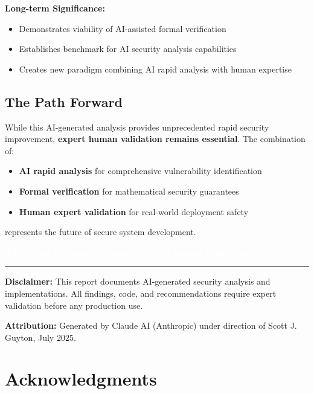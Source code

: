 \documentclass[11pt,a4paper]{article}
\begin{document}
\textbf{Long-term Significance:}
\begin{itemize}
    \item Demonstrates viability of AI-assisted formal verification
    \item Establishes benchmark for AI security analysis capabilities
    \item Creates new paradigm combining AI rapid analysis with human expertise
\end{itemize}

\subsection{The Path Forward}

While this AI-generated analysis provides unprecedented rapid security improvement, \textbf{expert human validation remains essential}. The combination of:

\begin{itemize}
    \item \textbf{AI rapid analysis} for comprehensive vulnerability identification
    \item \textbf{Formal verification} for mathematical security guarantees
    \item \textbf{Human expert validation} for real-world deployment safety
\end{itemize}

represents the future of secure system development.

\begin{center}
\colorbox{successgreen}{\textcolor{white}{\textbf{The future of secure systems lies in AI-human collaboration}}}
\end{center}

\vspace{2cm}

\hrule

\vspace{0.5cm}

\textbf{Disclaimer:} This report documents AI-generated security analysis and implementations. All findings, code, and recommendations require expert validation before any production use.

\textbf{Attribution:} Generated by Claude AI (Anthropic) under direction of Scott J. Guyton, July 2025.

\section{Acknowledgments}
\end{document}
